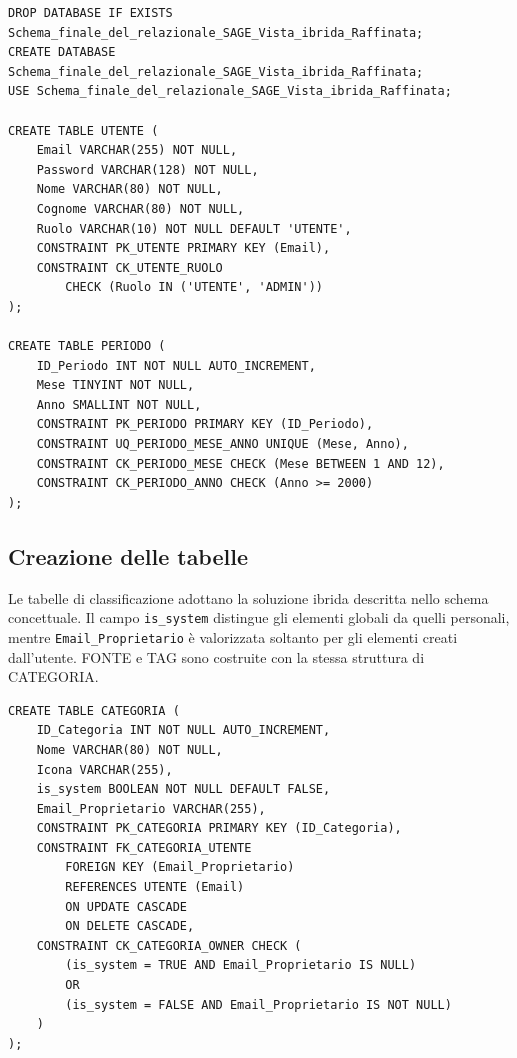 \documentclass[11pt,a4paper]{article}
\begin{document}
\begin{lstlisting}[caption={Creazione dello schema e delle tabelle UTENTE e PERIODO}]
DROP DATABASE IF EXISTS Schema_finale_del_relazionale_SAGE_Vista_ibrida_Raffinata;
CREATE DATABASE Schema_finale_del_relazionale_SAGE_Vista_ibrida_Raffinata;
USE Schema_finale_del_relazionale_SAGE_Vista_ibrida_Raffinata;

CREATE TABLE UTENTE (
    Email VARCHAR(255) NOT NULL,
    Password VARCHAR(128) NOT NULL,
    Nome VARCHAR(80) NOT NULL,
    Cognome VARCHAR(80) NOT NULL,
    Ruolo VARCHAR(10) NOT NULL DEFAULT 'UTENTE',
    CONSTRAINT PK_UTENTE PRIMARY KEY (Email),
    CONSTRAINT CK_UTENTE_RUOLO
        CHECK (Ruolo IN ('UTENTE', 'ADMIN'))
);

CREATE TABLE PERIODO (
    ID_Periodo INT NOT NULL AUTO_INCREMENT,
    Mese TINYINT NOT NULL,
    Anno SMALLINT NOT NULL,
    CONSTRAINT PK_PERIODO PRIMARY KEY (ID_Periodo),
    CONSTRAINT UQ_PERIODO_MESE_ANNO UNIQUE (Mese, Anno),
    CONSTRAINT CK_PERIODO_MESE CHECK (Mese BETWEEN 1 AND 12),
    CONSTRAINT CK_PERIODO_ANNO CHECK (Anno >= 2000)
);
\end{lstlisting}

\subsection{Creazione delle tabelle}
Le tabelle di classificazione adottano la soluzione ibrida descritta nello schema concettuale. Il campo \texttt{is\_system} distingue gli elementi globali da quelli personali, mentre \texttt{Email\_Proprietario} è valorizzata soltanto per gli elementi creati dall'utente. \textsc{FONTE} e \textsc{TAG} sono costruite con la stessa struttura di \textsc{CATEGORIA}.

\begin{lstlisting}[caption={Tabella CATEGORIA per elementi di sistema e personali}]
CREATE TABLE CATEGORIA (
    ID_Categoria INT NOT NULL AUTO_INCREMENT,
    Nome VARCHAR(80) NOT NULL,
    Icona VARCHAR(255),
    is_system BOOLEAN NOT NULL DEFAULT FALSE,
    Email_Proprietario VARCHAR(255),
    CONSTRAINT PK_CATEGORIA PRIMARY KEY (ID_Categoria),
    CONSTRAINT FK_CATEGORIA_UTENTE
        FOREIGN KEY (Email_Proprietario)
        REFERENCES UTENTE (Email)
        ON UPDATE CASCADE
        ON DELETE CASCADE,
    CONSTRAINT CK_CATEGORIA_OWNER CHECK (
        (is_system = TRUE AND Email_Proprietario IS NULL)
        OR
        (is_system = FALSE AND Email_Proprietario IS NOT NULL)
    )
);
\end{lstlisting}
\end{document}

